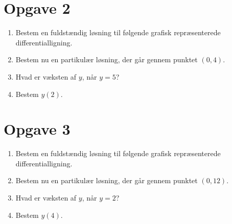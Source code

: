 \section*{Opgave 2}
\begin{enumerate}[label=\roman*)]
	\item Bestem en fuldstændig løsning til følgende grafisk repræsenterede differentialligning.
	\begin{center}
	\end{center}
	\item Bestem nu en partikulær løsning, der går gennem punktet $(0,4)$. 
	\item Hvad er væksten af $y$, når $y=5$?
	\item Bestem $y(2)$. 
\end{enumerate}
\newpage
\section*{Opgave 3}
\begin{enumerate}[label=\roman*)]
	\item Bestem en fuldstændig løsning til følgende grafisk repræsenterede differentialligning.
	\begin{center}
	\end{center}
	\item Bestem nu en partikulær løsning, der går gennem punktet $(0,12)$.
	\item Hvad er væksten af $y$, når $y=2$?
	\item Bestem $y(4)$.  
\end{enumerate}
